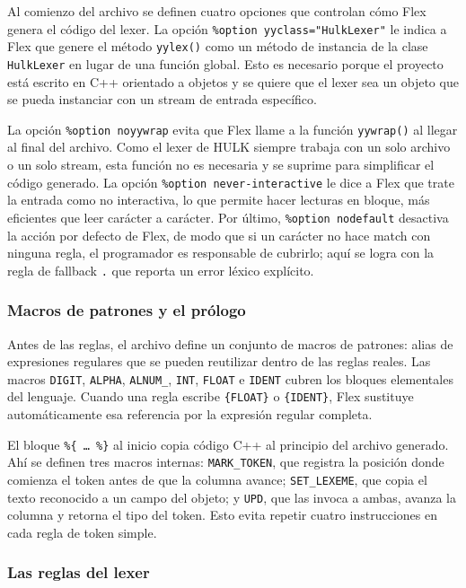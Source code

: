 \documentclass[11pt,a4paper]{article}
\begin{document}
Al comienzo del archivo se definen cuatro opciones que controlan cómo Flex genera el código del lexer. La opción \texttt{\%option yyclass="HulkLexer"} le indica a Flex que genere el método \texttt{yylex()} como un método de instancia de la clase \texttt{HulkLexer} en lugar de una función global. Esto es necesario porque el proyecto está escrito en C++ orientado a objetos y se quiere que el lexer sea un objeto que se pueda instanciar con un stream de entrada específico.

La opción \texttt{\%option noyywrap} evita que Flex llame a la función \texttt{yywrap()} al llegar al final del archivo. Como el lexer de HULK siempre trabaja con un solo archivo o un solo stream, esta función no es necesaria y se suprime para simplificar el código generado. La opción \texttt{\%option never-interactive} le dice a Flex que trate la entrada como no interactiva, lo que permite hacer lecturas en bloque, más eficientes que leer carácter a carácter. Por último, \texttt{\%option nodefault} desactiva la acción por defecto de Flex, de modo que si un carácter no hace match con ninguna regla, el programador es responsable de cubrirlo; aquí se logra con la regla de fallback \texttt{.} que reporta un error léxico explícito.

\subsubsection{Macros de patrones y el prólogo}

Antes de las reglas, el archivo define un conjunto de macros de patrones: alias de expresiones regulares que se pueden reutilizar dentro de las reglas reales. Las macros \texttt{DIGIT}, \texttt{ALPHA}, \texttt{ALNUM\_}, \texttt{INT}, \texttt{FLOAT} e \texttt{IDENT} cubren los bloques elementales del lenguaje. Cuando una regla escribe \texttt{\{FLOAT\}} o \texttt{\{IDENT\}}, Flex sustituye automáticamente esa referencia por la expresión regular completa.

El bloque \texttt{\%\{ \ldots\ \%\}} al inicio copia código C++ al principio del archivo generado. Ahí se definen tres macros internas: \texttt{MARK\_TOKEN}, que registra la posición donde comienza el token antes de que la columna avance; \texttt{SET\_LEXEME}, que copia el texto reconocido a un campo del objeto; y \texttt{UPD}, que las invoca a ambas, avanza la columna y retorna el tipo del token. Esto evita repetir cuatro instrucciones en cada regla de token simple.

\subsubsection{Las reglas del lexer}
\end{document}
